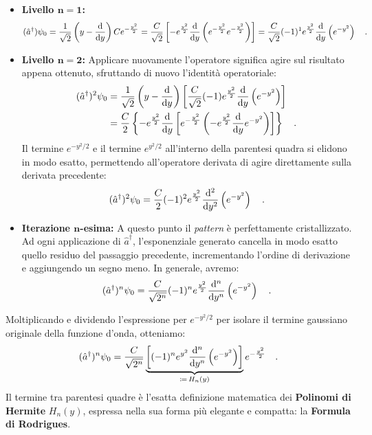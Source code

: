 \begin{itemize}
    \item \textbf{Livello $\bm{n = 1}$:}
    \[
        (\hat{a}^\dagger) \psi_0 = \frac{1}{\sqrt{2}}\left( y - \dv{}{y} \right) Ce^{-\frac{y^2}{2}} = \frac{C}{\sqrt{2}} \left[ -e^{\frac{y^2}{2}} \dv{}{y} \left( e^{-\frac{y^2}{2}} e^{-\frac{y^2}{2}} \right) \right] = \frac{C}{\sqrt{2}} (-1)^1 e^{\frac{y^2}{2}} \dv{}{y} \left( e^{-y^2} \right) \quad.
    \]

    \item \textbf{Livello $\bm{n = 2}$:} 
    Applicare nuovamente l'operatore significa agire sul risultato appena ottenuto, sfruttando di nuovo l'identità operatoriale:
    \[
    \begin{aligned}
        (\hat{a}^\dagger)^2 \psi_0 &= \frac{1}{\sqrt{2}}\left( y - \dv{}{y} \right) \left[ \frac{C}{\sqrt{2}} (-1) e^{\frac{y^2}{2}} \dv{}{y} \left( e^{-y^2} \right) \right] \\
        &= \frac{C}{2} \left\{ -e^{\frac{y^2}{2}} \dv{}{y} \left[ e^{-\frac{y^2}{2}} \left( -e^{\frac{y^2}{2}} \dv{}{y} e^{-y^2} \right) \right] \right\} \quad.
    \end{aligned}
    \]
    Il termine $e^{-y^2/2}$ e il termine $e^{y^2/2}$ all'interno della parentesi quadra si elidono in modo esatto, permettendo all'operatore derivata di agire direttamente sulla derivata precedente:
    \[
        (\hat{a}^\dagger)^2 \psi_0 = \frac{C}{2} (-1)^2 e^{\frac{y^2}{2}} \dv[2]{}{y} \left( e^{-y^2} \right) \quad.
    \]

    \item \textbf{Iterazione $\bm{n}$-esima:}
    A questo punto il \emph{pattern} è perfettamente cristallizzato. Ad ogni applicazione di $\hat{a}^\dagger$, l'esponenziale generato cancella in modo esatto quello residuo del passaggio precedente, incrementando l'ordine di derivazione e aggiungendo un segno meno. In generale, avremo:
    \[
        (\hat{a}^\dagger)^n \psi_0 = \frac{C}{\sqrt{2^n}} (-1)^n e^{\frac{y^2}{2}} \dv[n]{}{y} \left( e^{-y^2} \right) \quad.
    \]
\end{itemize}
Moltiplicando e dividendo l'espressione per $e^{-y^2/2}$ per isolare il termine gaussiano originale della funzione d'onda, otteniamo:
\[
    (\hat{a}^\dagger)^n \psi_0 = \frac{C}{\sqrt{2^n}} \underbrace{\left[ (-1)^n e^{y^2} \dv[n]{}{y} \left( e^{-y^2} \right) \right]}_{\coloneq \, H_n(y)} e^{-\frac{y^2}{2}} \quad.
\]
Il termine tra parentesi quadre è l'esatta definizione matematica dei \textbf{Polinomi di Hermite} $H_n(y)$, espressa nella sua forma più elegante e compatta: la \textbf{Formula di Rodrigues}. 

